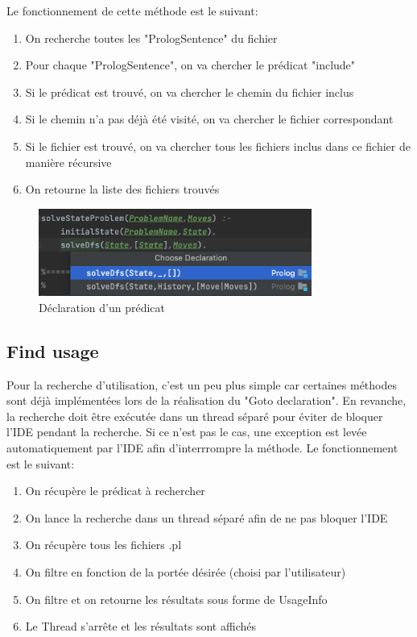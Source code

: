 \noindent Le fonctionnement de cette méthode est le suivant:
\begin{enumerate}
    \item On recherche toutes les "PrologSentence" du fichier
    \item Pour chaque "PrologSentence", on va chercher le prédicat "include"
    \item Si le prédicat est trouvé, on va chercher le chemin du fichier inclus
    \item Si le chemin n'a pas déjà été visité, on va chercher le fichier correspondant
    \item Si le fichier est trouvé, on va chercher tous les fichiers inclus dans ce fichier de manière récursive
    \item On retourne la liste des fichiers trouvés
\end{enumerate}


\begin{figure}[H]
    \centering
    \includegraphics[width=0.8\textwidth]{images/Goto_Declaration.png}
    \caption{Déclaration d'un prédicat}
    \label{fig:definition}
\end{figure}

\subsection{Find usage}
\noindent Pour la recherche d'utilisation, c'est un peu plus simple car certaines méthodes sont déjà implémentées lors de la réalisation du "Goto declaration".
\newdoubleline
En revanche, la recherche doit être exécutée dans un thread séparé pour éviter de bloquer l'IDE pendant la recherche. Si ce n'est pas le cas, une exception est levée automatiquement par l'IDE afin d'interrrompre la méthode.
\newdoubleline
Le fonctionnement est le suivant:
\begin{enumerate}
    \item On récupère le prédicat à rechercher
    \item On lance la recherche dans un thread séparé afin de ne pas bloquer l'IDE
    \item On récupère tous les fichiers .pl
    \item On filtre en fonction de la portée désirée (choisi par l'utilisateur)
    \item On filtre et on retourne les résultats sous forme de UsageInfo
    \item Le Thread s'arrête et les résultats sont affichés
\end{enumerate}

